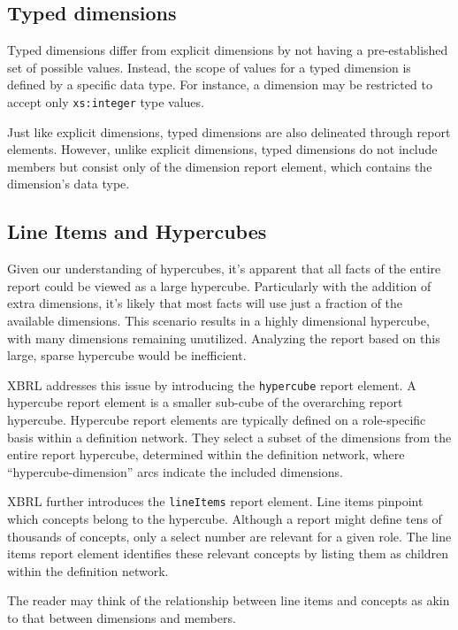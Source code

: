 \subsection{Typed dimensions}

Typed dimensions differ from explicit dimensions by not having a pre-established set of possible values.
Instead, the scope of values for a typed dimension is defined by a specific data type.
For instance, a dimension may be restricted to accept only \texttt{xs:integer} type values.

Just like explicit dimensions, typed dimensions are also delineated through report elements.
However, unlike explicit dimensions, typed dimensions do not include members but consist only of the dimension report element, which contains the dimension's data type.

\subsection{Line Items and Hypercubes}

Given our understanding of hypercubes, it's apparent that all facts of the entire report could be viewed as a large hypercube.
Particularly with the addition of extra dimensions, it's likely that most facts will use just a fraction of the available dimensions.
This scenario results in a highly dimensional hypercube, with many dimensions remaining unutilized.
Analyzing the report based on this large, sparse hypercube would be inefficient.

XBRL addresses this issue by introducing the \texttt{hypercube} report element.
A hypercube report element is a smaller sub-cube of the overarching report hypercube.
Hypercube report elements are typically defined on a role-specific basis within a definition network.
They select a subset of the dimensions from the entire report hypercube,
determined within the definition network, where “hypercube-dimension” arcs indicate the included dimensions.

XBRL further introduces the \texttt{lineItems} report element.
Line items pinpoint which concepts belong to the hypercube.
Although a report might define tens of thousands of concepts, only a select number are relevant for a given role.
The line items report element identifies these relevant concepts by listing them as children within the definition network.

The reader may think of the relationship between line items and concepts as akin to that between dimensions and members.

